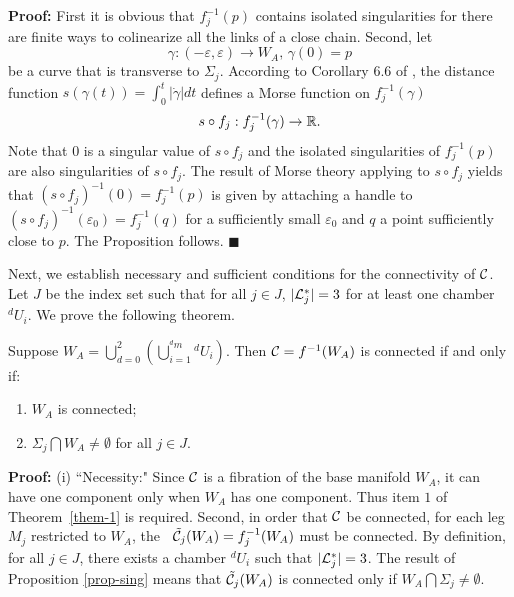 \medskip

{\bf Proof:} First it is obvious that $f_j^{-1}(p)$ contains
isolated singularities for there are finite ways to colinearize
all the links of a close chain. Second, let
\[
   \gamma: (-\varepsilon,\varepsilon) \rightarrow W_A,\, \gamma(0)=p
\]
be a curve that is transverse to $\Sigma_j$. According to
Corollary 6.6 of \cite{MT1}, the distance function
$s(\gamma(t))=\int_{0}^t |{\dot \gamma}|dt$ defines a Morse
function on $f_j^{-1}(\gamma)$
\[
   s \circ f_j: f_j^{-1}(\gamma) \rightarrow {\Bbb R}.
\]
Note that $0$ is a singular value of $s \circ f_j$ and the
isolated singularities of $f_j^{-1}(p)$ are also singularities of
$s \circ f_j$. The result of Morse theory applying to $s \circ
f_j$ yields that $(s \circ f_j)^{-1}(0)=f_j^{-1}(p)$ is given by
attaching a handle to $(s \circ
f_j)^{-1}(\varepsilon_0)=f_j^{-1}(q)$ for a sufficiently small
$\varepsilon_0$ and $q$ a point sufficiently close to $p$. The
Proposition follows.
  \hfill$\blacksquare$\medskip

Next, we establish necessary and sufficient conditions for the
connectivity of ${\cal C}$.  Let ${J}$ be the index set such that
for all $j \in {J}$, $|{\cal L}_j^*|=3$ for at least one chamber
${}^d\!U_i$. We prove the following theorem.

\medskip

\begin{Theorem}
\label{them-1} \rm Suppose $W_A = \bigcup_{d=0}^2 \left(
\bigcup_{i=1}^{{}^d\!m} {}^d\!U_i \right)$.  Then ${\cal C} =
f^{-1}(W_A)$ is connected if and only if:
\begin{enumerate}
\item
    $W_A$ is connected;
\item
    $\Sigma_j \bigcap W_A \ne \emptyset$ for all $j \in {J}$.
\end{enumerate}
\end{Theorem}

\medskip

{\bf Proof:} (i) ``Necessity:" Since ${\cal C}$ is a fibration of
the base manifold $W_A$, it can have one component only when $W_A$
has one component.  Thus item $1$ of Theorem~\ref{them-1} is
required.
%
Second, in order that ${\cal C}$ be connected, for each leg $M_j$
restricted to $W_A$, the \cspace \ ${\tilde {\cal C}}_j(W_A) =
f_j^{-1}(W_A)$ must be connected. By definition, for all $j \in
{J}$, there exists a chamber ${}^d\!U_i$ such that $|{\cal
L}_j^*|=3$. The result of Proposition \ref{prop-sing} means that
${\tilde {\cal C}}_j(W_A)$ is connected only if $W_A \bigcap
\Sigma_j \ne \emptyset$.

